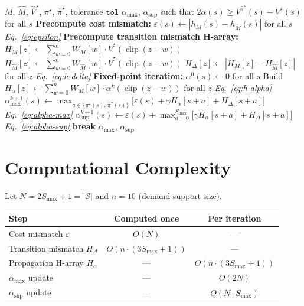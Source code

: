 \documentclass[11pt]{article}
\newcommand{\Smax}{S_{\max}}
\newcommand{\clip}{\operatorname{clip}}
\newcommand{\pistar}{\pi^\star}
\newcommand{\pihatstar}{\hat\pi^\star}
\newcommand{\Vstar}{V^\star}
\newcommand{\Vhatstar}{\hat V^\star}
\newcommand{\Vpihat}{V^{\pihatstar}}
\begin{document}
\begin{algorithm}[H]
\caption{Sample-Path Dependent AIS Bound}
\label{alg:sample-path}
\begin{algorithmic}[1]
\Require $M$, $\hat M$, $\Vhatstar$, $\pistar$, $\pihatstar$, tolerance $\texttt{tol}$
\Ensure $\alpha_{\max}$, $\alpha_{\sup}$ such that
        $2\alpha(s) \ge \Vpihat(s) - \Vstar(s)$ for all $s$
\Statex
\State \textbf{Precompute cost mismatch:}
  $\varepsilon(s) \gets |h_M(s) - h_{\hat M}(s)|$ for all $s$
  \hfill \textit{Eq.~\eqref{eq:epsilon}}
\Statex
\State \textbf{Precompute transition mismatch H-array:}
\For{$z = -\Smax$ \textbf{to} $2\Smax$}
  \State $H_M[z] \gets \sum_{w=0}^{n} W_M[w] \cdot \Vhatstar(\clip(z-w))$
  \State $H_{\hat M}[z] \gets \sum_{w=0}^{n} W_{\hat M}[w] \cdot \Vhatstar(\clip(z-w))$
\EndFor
\State $H_\Delta[z] \gets |H_M[z] - H_{\hat M}[z]|$ for all $z$
  \hfill \textit{Eq.~\eqref{eq:h-delta}}
\Statex
\State \textbf{Fixed-point iteration:}
\State $\alpha^0(s) \gets 0$ for all $s$
  \State Build $H_\alpha[z] \gets \sum_{w=0}^{n} W_M[w] \cdot \alpha^k(\clip(z-w))$
    for all $z$
    \hfill \textit{Eq.~\eqref{eq:h-alpha}}
    \State $\alpha^{k+1}_{\max}(s) \gets
      \max_{a \in \{\pistar(s),\, \pihatstar(s)\}}
      \bigl[\varepsilon(s) + \gamma H_\alpha[s+a] + H_\Delta[s+a]\bigr]$
      \hfill \textit{Eq.~\eqref{eq:alpha-max}}
    \State $\alpha^{k+1}_{\sup}(s) \gets
      \varepsilon(s) + \max_{a=0}^{\Smax}
      \bigl[\gamma H_\alpha[s+a] + H_\Delta[s+a]\bigr]$
      \hfill \textit{Eq.~\eqref{eq:alpha-sup}}
  \EndFor
    \State \textbf{break}
  \EndIf
\EndFor
\State \Return $\alpha_{\max}$, $\alpha_{\sup}$
\end{algorithmic}
\end{algorithm}

\section{Computational Complexity}

Let $N = 2\Smax + 1 = |\mathcal{S}|$ and $n = 10$ (demand support size).

\begin{center}
\begin{tabular}{lcc}
\toprule
Step & Computed once & Per iteration \\
\midrule
Cost mismatch $\varepsilon$ & $O(N)$ & --- \\
Transition mismatch $H_\Delta$ & $O(n \cdot (3\Smax+1))$ & --- \\
Propagation H-array $H_\alpha$ & --- & $O(n \cdot (3\Smax+1))$ \\
$\alpha_{\max}$ update & --- & $O(2N)$ \\
$\alpha_{\sup}$ update & --- & $O(N \cdot \Smax)$ \\
\bottomrule
\end{tabular}
\end{center}
\end{document}

